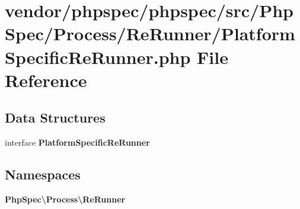 \section{vendor/phpspec/phpspec/src/\+Php\+Spec/\+Process/\+Re\+Runner/\+Platform\+Specific\+Re\+Runner.php File Reference}
\label{_platform_specific_re_runner_8php}
\subsection*{Data Structures}
\begin{DoxyCompactItemize}
\item 
interface {\bf Platform\+Specific\+Re\+Runner}
\end{DoxyCompactItemize}
\subsection*{Namespaces}
\begin{DoxyCompactItemize}
\item 
 {\bf Php\+Spec\textbackslash{}\+Process\textbackslash{}\+Re\+Runner}
\end{DoxyCompactItemize}
